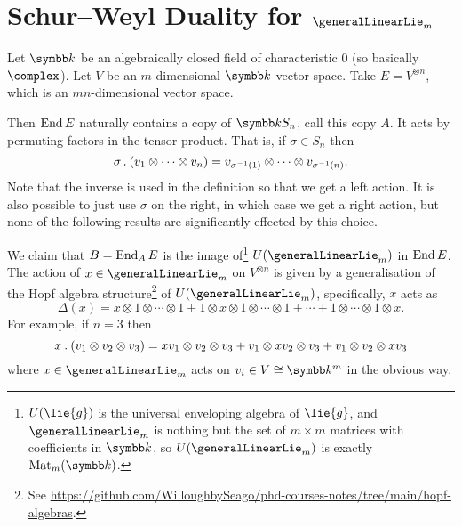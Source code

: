 \section{Schur--Weyl Duality for \texorpdfstring{\(\generalLinearLie_m\)}{glm}}
Let \(\field\) be an algebraically closed field of characteristic \(0\) (so basically \(\complex\)).
Let \(V\) be an \(m\)-dimensional \(\field\)-vector space.
Take \(E = V^{\otimes n}\), which is an \(mn\)-dimensional vector space.

Then \(\operatorname{End} E\) naturally contains a copy of \(\field S_n\), call this copy \(A\).
It acts by permuting factors in the tensor product.
That is, if \(\sigma \in S_n\) then
\begin{equation}
    \sigma \mathbin{.} (v_1 \otimes \dotsb \otimes v_n) = v_{\sigma^{-1}(1)} \otimes \dotsb \otimes v_{\sigma^{-1}(n)}.
\end{equation}
Note that the inverse is used in the definition so that we get a left action.
It is also possible to just use \(\sigma\) on the right, in which case we get a right action, but none of the following results are significantly effected by this choice.

We claim that \(B = \operatorname{End}_A E\) is the image of\footnote{\(U(\lie{g})\) is the universal enveloping algebra of \(\lie{g}\), and \(\generalLinearLie_m\) is nothing but the set of \(m \times m\) matrices with coefficients in \(\field\), so \(U(\generalLinearLie_m)\) is exactly \(\Mat_m(\field)\).} \(U(\generalLinearLie_m)\) in \(\operatorname{End} E\).
The action of \(x \in \generalLinearLie_m\) on \(V^{\otimes n}\) is given by a generalisation of the Hopf algebra structure\footnote{See \url{https://github.com/WilloughbySeago/phd-courses-notes/tree/main/hopf-algebras}.} of \(U(\generalLinearLie_m)\), specifically, \(x\) acts as
\begin{equation}
    \Delta(x) = x \otimes 1 \otimes \dotsb \otimes 1 + 1 \otimes x \otimes 1 \otimes \dotsb \otimes 1 + \dotsb + 1 \otimes \dotsb \otimes 1 \otimes x.
\end{equation}
For example, if \(n = 3\) then
\begin{equation}
    x \mathbin{.} (v_1 \otimes v_2 \otimes v_3) = xv_1 \otimes v_2 \otimes v_3 + v_1 \otimes xv_2 \otimes v_3 + v_1 \otimes v_2 \otimes xv_3
\end{equation}
where \(x \in \generalLinearLie_m\) acts on \(v_i \in V \isomorphic \field^m\) in the obvious way.

